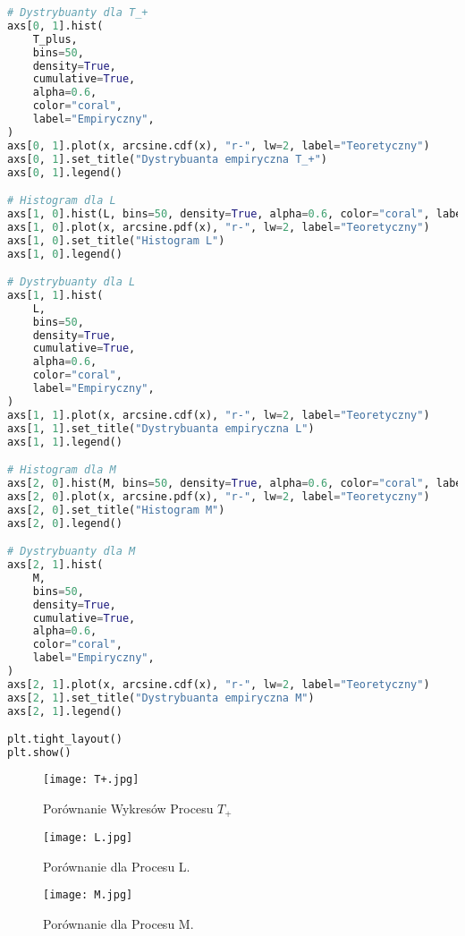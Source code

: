 \documentclass[12pt,letterpaper]{article}
\theoremstyle{definition}
\begin{document}
\begin{lstlisting}[language=Python, caption=Skrypt Zad 6.]
# Dystrybuanty dla T_+
axs[0, 1].hist(
    T_plus,
    bins=50,
    density=True,
    cumulative=True,
    alpha=0.6,
    color="coral",
    label="Empiryczny",
)
axs[0, 1].plot(x, arcsine.cdf(x), "r-", lw=2, label="Teoretyczny")
axs[0, 1].set_title("Dystrybuanta empiryczna T_+")
axs[0, 1].legend()

# Histogram dla L
axs[1, 0].hist(L, bins=50, density=True, alpha=0.6, color="coral", label="Empiryczny")
axs[1, 0].plot(x, arcsine.pdf(x), "r-", lw=2, label="Teoretyczny")
axs[1, 0].set_title("Histogram L")
axs[1, 0].legend()

# Dystrybuanty dla L
axs[1, 1].hist(
    L,
    bins=50,
    density=True,
    cumulative=True,
    alpha=0.6,
    color="coral",
    label="Empiryczny",
)
axs[1, 1].plot(x, arcsine.cdf(x), "r-", lw=2, label="Teoretyczny")
axs[1, 1].set_title("Dystrybuanta empiryczna L")
axs[1, 1].legend()

# Histogram dla M
axs[2, 0].hist(M, bins=50, density=True, alpha=0.6, color="coral", label="Empiryczny")
axs[2, 0].plot(x, arcsine.pdf(x), "r-", lw=2, label="Teoretyczny")
axs[2, 0].set_title("Histogram M")
axs[2, 0].legend()

# Dystrybuanty dla M
axs[2, 1].hist(
    M,
    bins=50,
    density=True,
    cumulative=True,
    alpha=0.6,
    color="coral",
    label="Empiryczny",
)
axs[2, 1].plot(x, arcsine.cdf(x), "r-", lw=2, label="Teoretyczny")
axs[2, 1].set_title("Dystrybuanta empiryczna M")
axs[2, 1].legend()

plt.tight_layout()
plt.show()


\end{lstlisting}


\begin{figure}[H]
		

				\centering
				\texttt{[image: T+.jpg]}
				\caption{Porównanie Wykresów Procesu $T_+$}
				\label{fig:zdjecie1}
			\hfill
		\end{figure}
\begin{figure}[H]
                    \centering
				\texttt{[image: L.jpg]}
				\caption{Porównanie dla Procesu L.}
				\label{fig:zdjecie1}
			\hfill
		\end{figure}
\begin{figure}[H]
			\centering

				\centering
				\texttt{[image: M.jpg]}
				\caption{Porównanie dla Procesu M.}
				\label{fig:zdjecie1}
			\hfill
		\end{figure}
\end{document}
